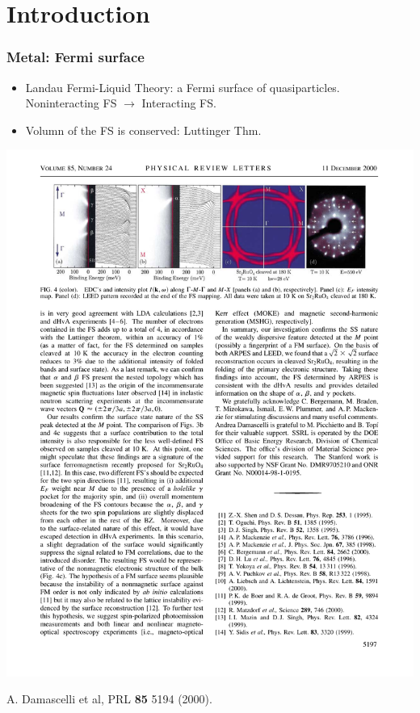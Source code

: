 \documentclass[xcolor=table, 10pt, aspectratio=43]{beamer}
\begin{document}
\section{Introduction}

\begin{frame}
  \frametitle{Metal: Fermi surface}
\begin{itemize}
  \item Landau Fermi-Liquid Theory: a Fermi surface of quasiparticles.\\
  Noninteracting FS $\rightarrow$ Interacting FS.
  \item Volumn of the FS is conserved: Luttinger Thm.
\end{itemize}
\begin{center}
	\includegraphics{../resources/SrRuO_FS}

	{\small A. Damascelli et al, PRL \textbf{85} 5194 (2000).}
\end{center}
\end{frame}
\end{document}
